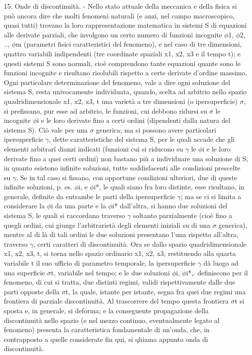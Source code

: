 \documentclass[a4paper]{article}
\begin{document}
15. Onde di discontinuità. - Nello stato attuale della meccanica e della fisica si può ancora dire che molti fenomeni naturali (e anzi, nel campo macroscopico, quasi tutti) trovano la loro rappresentazione matematica in sistemi S di equazioni alle derivate parziali, che involgono un certo numero di funzioni incognite $\phi$1, $\phi$2, .., $\phi$m (parametri fisici caratteristici del fenomeno), e nel caso di tre dimensioni, quattro variabili indipendenti (tre coordinate spaziali x1, x2, x3 e il tempo t); e questi sistemi S sono normali, cioè comprendono tante equazioni quante sono le funzioni incognite e risultano risolubili rispetto a certe derivate d'ordine massimo. Ogni particolare determinazione del fenomeno, vale a dire ogni soluzione del sistema S, resta univocamente individuata, quando, scelta ad arbitrio nello spazio quadridimensionale x1, x2, x3, t una varietà a tre dimensioni (o ipersuperficie) $\sigma$, si prefissano, pur esse ad arbitrio, le funzioni, cui debbono ridursi su $\sigma$ le incognite $\phi$i e le loro derivate fino a certi ordini (dipendenti dalla natura del sistema S). Ciò vale per una $\sigma$ generica; ma si possono avere particolari ipersuperficie $\gamma$, dette caratteristiche del sistema S, per le quali accade che gli elementi arbitrarî dianzi indicati (funzioni cui si riducono su $\gamma$ le $\phi$i e le loro derivate fino a quei certi ordini) non bastano più a individuare una soluzione di S, in quanto esistono infinite soluzioni, tutte soddisfacenti alle condizioni prescelte su $\gamma$. Se in tal caso si fissano, con opportune condizioni ulteriori, due di queste infinite soluzioni, p. es. $\phi$i, e $\phi$i*, le quali siano fra loro distinte, esse risultano, in generale, definite da entrambe le parti della ipersuperficie $\gamma$; ma se ci si limita a considerare la $\phi$i da una parte e la $\phi$i* dall'altra, si hanno due soluzioni del sistema S, le quali si raccordano traverso $\gamma$ soltanto parzialmente (cioè fino a quegli ordini, cui giunge l'arbitrarietà degli elementi iniziali su di una $\sigma$ generica), mentre al di là di tali ordini le due soluzioni presentano l'una rispetto all'altra, traverso $\gamma$, certi caratteri di discontinuità. Ora se dallo spazio quadridimensionale x1, x2, x3, t, si torna nello spazio ordinario x1, x2, x3, restituendo alla quarta variabile t il suo ufficio di parametro temporale, la ipersuperficie $\gamma$ dà luogo ad una superficie $\sigma$t, variabile nel tempo; e le due soluzioni $\phi$i, $\phi$i*,. definiscono per il fenomeno, di cui si tratta, due distinti regimi, validi rispettivamente dalle due parti opposte della $\sigma$t, la quale, istante per istante, segna fra quei due regimi una frontiera di parziale discontinuità. Al trascorrere del tempo questa frontiera $\sigma$t si sposta e, in generale, si deforma; e la conseguente propagazione della discontinuità nello spazio (e nel mezzo continuo, eventualmente legato al fenomeno) presenta la caratteristica fondamentale di un'onda, che, in contrapposto a quelle considerate fin qui, si qhiama appunto onda di discontinuità.
\end{document}
